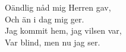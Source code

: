 Oändlig nåd mig Herren gav, \\
Och än i dag mig ger. \\
Jag kommit hem, jag vilsen var, \\
Var blind, men nu jag ser. \\
